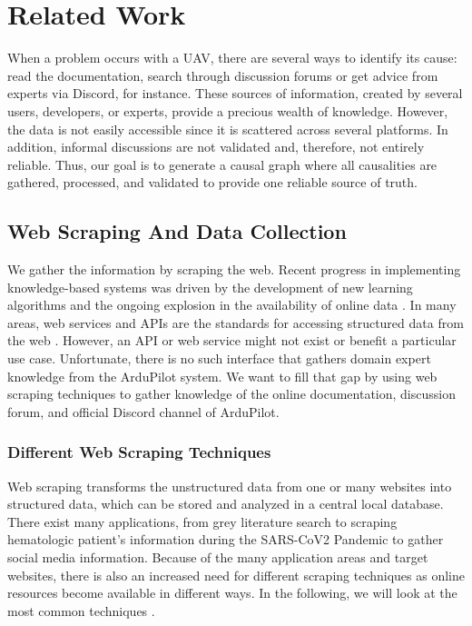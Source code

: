 


\chapter{Related Work}\label{ch:related-work}

When a problem occurs with a \ac{UAV}, there are several ways to identify its cause: read the documentation, search
through discussion forums or get advice from experts via Discord, for instance.
These sources of information, created by several users, developers, or experts, provide a precious wealth of knowledge.
However, the data is not easily accessible since it is scattered across several platforms.
In addition, informal discussions are not validated and, therefore, not entirely reliable.
Thus, our goal is to generate a causal graph where all causalities are gathered, processed, and validated to provide
one reliable source of truth.


\section{Web Scraping And Data Collection}\label{sec:web-scraping-and-data-collection}
We gather the information by scraping the web.
Recent progress in implementing knowledge-based systems was driven by the development of new learning algorithms and the ongoing explosion in the availability of online data \cite{jordan2015machine}.
In many areas, web services and \ac{API}s are the standards for accessing structured data from the web \cite{glez2014web, hernandez2018web}.
However, an API or web service might not exist or benefit a particular use case.
Unfortunate, there is no such interface that gathers domain expert knowledge from the ArduPilot system.
We want to fill that gap by using web scraping techniques to gather knowledge of the online documentation, discussion forum, and official Discord channel of ArduPilot.

\subsection{Different Web Scraping Techniques}\label{subsec:different-web-scraping-techniques}
Web scraping transforms the unstructured data from one or many websites into structured data, which can be stored and analyzed in a central local database.
There exist many applications, from grey literature search \cite{haddaway2015use} to scraping hematologic patient's information during the SARS-CoV2 Pandemic \cite{melchor2020ct} to gather social media \cite{rajput2019big}  information.
Because of the many application areas and target websites, there is also an increased need for different scraping techniques as online resources become available in different ways.
In the following, we will look at the most common techniques \cite{sirisuriya2015comparative}.

